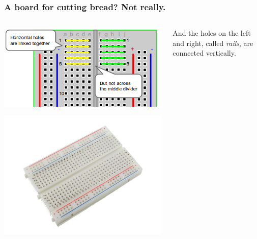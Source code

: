 \documentclass{beamer}
\begin{document}
\begin{frame}
  \frametitle{A board for cutting bread? Not really.}

  \begin{columns}
    \begin{column}{0.5\textwidth}
      \centering
      \includegraphics[width=\textwidth]{res/bb-diag.png}

      \includegraphics[width=\textwidth]{res/breadboard.jpg}
    \end{column}
    \begin{column}{0.5\textwidth}
      And the holes on the left and right, called \emph{rails}, are connected vertically.
    \end{column}
  \end{columns}
\end{frame}
\end{document}
